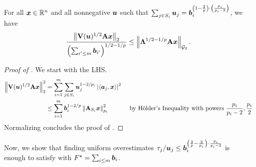 \documentclass[11pt]{article}
\numberwithin{equation}{section}
\begin{document}
\begin{lemma}
\label{lemma:blw_rounding_matrix}
For all $\bm{x}\in\mathbb{R}^n$ and all nonnegative $\bm{u}$ such that $\sum_{j \in S_i} \bm{u}_j = \bm{b}_i^{\left(1-\frac{2}{p}\right)\cdot\left(\frac{p_i}{p_i-2}\right)}$, we have
\begin{align*}
    \frac{\left\lVert \mathbf{V}(\bm{u})^{1/2}\mathbf{A}\bm{x} \right\rVert_2}{\left(\sum_{i' \le m} \bm{b}_{i'}\right)^{1/2-1/p}} \le \left\lVert \mathbf{\Lambda}^{1/2-1/p}\mathbf{A}\bm{x} \right\rVert_{\mathcal{G}_{2}}.
\end{align*}
\end{lemma}
\begin{proof}[Proof of ]
We start with the LHS.
\begin{align*}
    \left\lVert \mathbf{V}(\bm{u})^{1/2}\mathbf{A}\bm{x} \right\rVert_2^2 &= \sum_{i=1}^m \sum_{j \in S_i} \bm{u}_j^{1-2/p_i}\left\lvert \left\langle \bm{a}_j,\bm{x} \right\rangle \right\rvert^2 \\
    &\le \sum_{i=1}^m \bm{b}_i^{1-2/p}\left\lVert \mathbf{A}_{S_i}\bm{x} \right\rVert_{p_i}^2 & \text{ by H\"older's Inequality with powers } \frac{p_i}{p_i-2}, \frac{p_i}{2}
\end{align*}
Normalizing concludes the proof of .
\end{proof}

Now, we show that finding uniform overestimates $\tau_j/\bm{u}_j \le \bm{b}_i^{\left(\frac{2}{p}-\frac{2}{p_i}\right)\cdot\frac{p_i}{p_i-2}}$ is enough to satisfy  with $F^{\star} = \sum_{i \le m} \bm{b}_i$.
\end{document}
